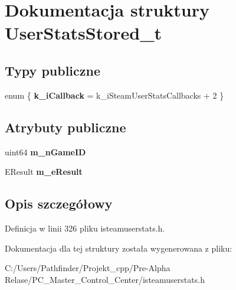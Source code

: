 \hypertarget{struct_user_stats_stored__t}{}\section{Dokumentacja struktury User\+Stats\+Stored\+\_\+t}
\label{struct_user_stats_stored__t}
\subsection*{Typy publiczne}
\begin{DoxyCompactItemize}
\item 
\mbox{\label{struct_user_stats_stored__t_af3b2194f458abb4a777e2d2db3b3e16b}} 
enum \{ {\bfseries k\+\_\+i\+Callback} = k\+\_\+i\+Steam\+User\+Stats\+Callbacks + 2
 \}
\end{DoxyCompactItemize}
\subsection*{Atrybuty publiczne}
\begin{DoxyCompactItemize}
\item 
\mbox{\label{struct_user_stats_stored__t_a084d454207004ec5595c65ffbedeac9f}} 
uint64 {\bfseries m\+\_\+n\+Game\+ID}
\item 
\mbox{\label{struct_user_stats_stored__t_a2be31244337a3284abddb90ad594e491}} 
E\+Result {\bfseries m\+\_\+e\+Result}
\end{DoxyCompactItemize}


\subsection{Opis szczegółowy}


Definicja w linii 326 pliku isteamuserstats.\+h.



Dokumentacja dla tej struktury została wygenerowana z pliku\+:\begin{DoxyCompactItemize}
\item 
C\+:/\+Users/\+Pathfinder/\+Projekt\+\_\+cpp/\+Pre-\/\+Alpha Relase/\+P\+C\+\_\+\+Master\+\_\+\+Control\+\_\+\+Center/isteamuserstats.\+h\end{DoxyCompactItemize}
